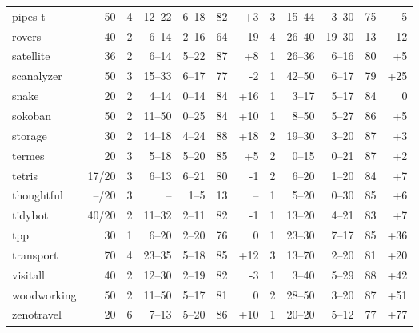 \documentclass{article}
\begin{document}
\begin{table}
\begin{tabular}{l@{}rr|rrrr|r|rrrr}
       pipes-t &     50 &   4 &   12--22 &   6--18 &  82 &   {\color{blue}+3} &   3 &    15--44 &   3--30 &  75 &    {\color{red}-5} \\
        rovers &     40 &   2 &    6--14 &   2--16 &  64 &   {\color{red}-19} &   4 &    26--40 &  19--30 &  13 &   {\color{red}-12} \\
     satellite &     36 &   2 &    6--14 &   5--22 &  87 &   {\color{blue}+8} &   1 &    26--36 &   6--16 &  80 &   {\color{blue}+5} \\
    scanalyzer &     50 &   3 &   15--33 &   6--17 &  77 &    {\color{red}-2} &   1 &    42--50 &   6--17 &  79 &  {\color{blue}+25} \\
         snake &     20 &   2 &    4--14 &   0--14 &  84 &  {\color{blue}+16} &   1 &     3--17 &   5--17 &  84 &                  0 \\
       sokoban &     50 &   2 &   11--50 &   0--25 &  84 &  {\color{blue}+10} &   1 &     8--50 &   5--27 &  86 &   {\color{blue}+5} \\
       storage &     30 &   2 &   14--18 &   4--24 &  88 &  {\color{blue}+18} &   2 &    19--30 &   3--20 &  87 &   {\color{blue}+3} \\
        termes &     20 &   3 &    5--18 &   5--20 &  85 &   {\color{blue}+5} &   2 &     0--15 &   0--21 &  87 &   {\color{blue}+2} \\
        tetris &  17/20 &   3 &    6--13 &   6--21 &  80 &    {\color{red}-1} &   2 &     6--20 &   1--20 &  84 &   {\color{blue}+7} \\
    thoughtful &  --/20 &   3 &       -- &    1--5 &  13 &                 -- &   1 &     5--20 &   0--30 &  85 &   {\color{blue}+6} \\
       tidybot &  40/20 &   2 &   11--32 &   2--11 &  82 &    {\color{red}-1} &   1 &    13--20 &   4--21 &  83 &   {\color{blue}+7} \\
           tpp &     30 &   1 &    6--20 &   2--20 &  76 &                  0 &   1 &    23--30 &   7--17 &  85 &  {\color{blue}+36} \\
     transport &     70 &   4 &   23--35 &   5--18 &  85 &  {\color{blue}+12} &   3 &    13--70 &   2--20 &  81 &  {\color{blue}+20} \\
      visitall &     40 &   2 &   12--30 &   2--19 &  82 &    {\color{red}-3} &   1 &     3--40 &   5--29 &  88 &  {\color{blue}+42} \\
   woodworking &     50 &   2 &   11--50 &   5--17 &  81 &                  0 &   2 &    28--50 &   3--20 &  87 &  {\color{blue}+51} \\
    zenotravel &     20 &   6 &    7--13 &   5--20 &  86 &  {\color{blue}+10} &   1 &    20--20 &   5--12 &  77 &  {\color{blue}+77} \\
\bottomrule
\end{tabular}

            \end{table}
\end{document}
